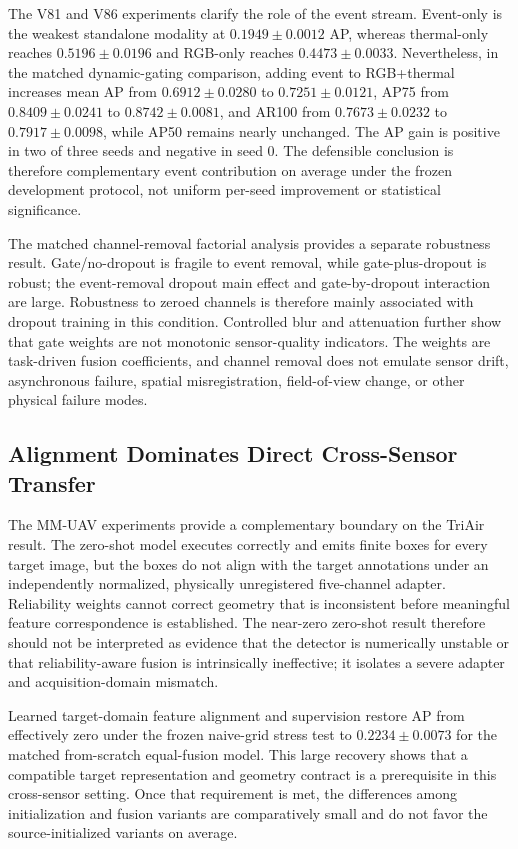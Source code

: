 The V81 and V86 experiments clarify the role of the event stream. Event-only is the weakest standalone modality at $0.1949\pm0.0012$ AP, whereas thermal-only reaches $0.5196\pm0.0196$ and RGB-only reaches $0.4473\pm0.0033$. Nevertheless, in the matched dynamic-gating comparison, adding event to RGB+thermal increases mean AP from $0.6912\pm0.0280$ to $0.7251\pm0.0121$, AP75 from $0.8409\pm0.0241$ to $0.8742\pm0.0081$, and AR100 from $0.7673\pm0.0232$ to $0.7917\pm0.0098$, while AP50 remains nearly unchanged. The AP gain is positive in two of three seeds and negative in seed 0. The defensible conclusion is therefore complementary event contribution on average under the frozen development protocol, not uniform per-seed improvement or statistical significance.

The matched channel-removal factorial analysis provides a separate robustness result. Gate/no-dropout is fragile to event removal, while gate-plus-dropout is robust; the event-removal dropout main effect and gate-by-dropout interaction are large. Robustness to zeroed channels is therefore mainly associated with dropout training in this condition. Controlled blur and attenuation further show that gate weights are not monotonic sensor-quality indicators. The weights are task-driven fusion coefficients, and channel removal does not emulate sensor drift, asynchronous failure, spatial misregistration, field-of-view change, or other physical failure modes.

\subsection{Alignment Dominates Direct Cross-Sensor Transfer}
The MM-UAV experiments provide a complementary boundary on the TriAir result. The zero-shot model executes correctly and emits finite boxes for every target image, but the boxes do not align with the target annotations under an independently normalized, physically unregistered five-channel adapter. Reliability weights cannot correct geometry that is inconsistent before meaningful feature correspondence is established. The near-zero zero-shot result therefore should not be interpreted as evidence that the detector is numerically unstable or that reliability-aware fusion is intrinsically ineffective; it isolates a severe adapter and acquisition-domain mismatch.

Learned target-domain feature alignment and supervision restore AP from effectively zero under the frozen naive-grid stress test to $0.2234\pm0.0073$ for the matched from-scratch equal-fusion model. This large recovery shows that a compatible target representation and geometry contract is a prerequisite in this cross-sensor setting. Once that requirement is met, the differences among initialization and fusion variants are comparatively small and do not favor the source-initialized variants on average.


